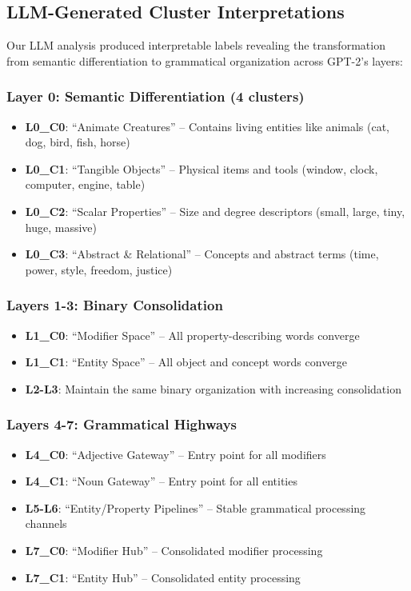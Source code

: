 \subsection{LLM-Generated Cluster Interpretations}

Our LLM analysis produced interpretable labels revealing the transformation from semantic differentiation to grammatical organization across GPT-2's layers:

\subsubsection{Layer 0: Semantic Differentiation (4 clusters)}
\begin{itemize}
    \item \textbf{L0\_C0}: ``Animate Creatures'' -- Contains living entities like animals (cat, dog, bird, fish, horse)
    \item \textbf{L0\_C1}: ``Tangible Objects'' -- Physical items and tools (window, clock, computer, engine, table)
    \item \textbf{L0\_C2}: ``Scalar Properties'' -- Size and degree descriptors (small, large, tiny, huge, massive)
    \item \textbf{L0\_C3}: ``Abstract \& Relational'' -- Concepts and abstract terms (time, power, style, freedom, justice)
\end{itemize}

\subsubsection{Layers 1-3: Binary Consolidation}
\begin{itemize}
    \item \textbf{L1\_C0}: ``Modifier Space'' -- All property-describing words converge
    \item \textbf{L1\_C1}: ``Entity Space'' -- All object and concept words converge
    \item \textbf{L2-L3}: Maintain the same binary organization with increasing consolidation
\end{itemize}

\subsubsection{Layers 4-7: Grammatical Highways}
\begin{itemize}
    \item \textbf{L4\_C0}: ``Adjective Gateway'' -- Entry point for all modifiers
    \item \textbf{L4\_C1}: ``Noun Gateway'' -- Entry point for all entities
    \item \textbf{L5-L6}: ``Entity/Property Pipelines'' -- Stable grammatical processing channels
    \item \textbf{L7\_C0}: ``Modifier Hub'' -- Consolidated modifier processing
    \item \textbf{L7\_C1}: ``Entity Hub'' -- Consolidated entity processing
\end{itemize}

